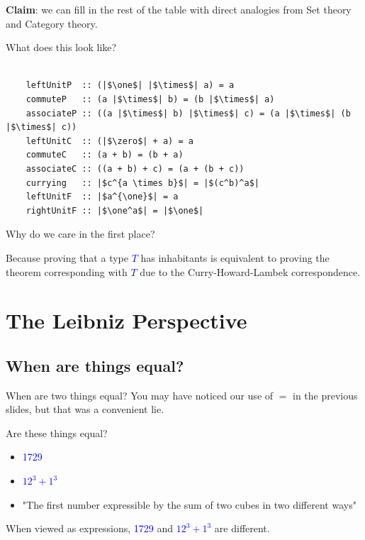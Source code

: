 \documentclass[tikz]{beamer}
\newcommand{\zero}{\bm{\mathbb{0}}}
\newcommand{\one}{\bm{\mathbb{1}}}
\newcommand{\blue}[1]{\textcolor{blue}{#1}}
\newcommand{\mblue}[1]{\textcolor{blue}{$#1$}}
\theoremstyle{definition}
\begin{document}
\frame
{ 
	\textbf{Claim}: we can fill in the rest of the table with direct analogies from Set theory and Category theory. 
}


\begin{frame}[fragile]
	What does this look like?
	
	\begin{center}
	\begin{verbatim}
	
	leftUnitP  :: (|$\one$| |$\times$| a) = a
	commuteP   :: (a |$\times$| b) = (b |$\times$| a)
	associateP :: ((a |$\times$| b) |$\times$| c) = (a |$\times$| (b |$\times$| c))
	leftUnitC  :: (|$\zero$| + a) = a
	commuteC   :: (a + b) = (b + a)
	associateC :: ((a + b) + c) = (a + (b + c))
	currying   :: |$c^{a \times b}$| = |$(c^b)^a$|
	leftUnitF  :: |$a^{\one}$| = a
	rightUnitF :: |$\one^a$| = |$\one$|
	\end{verbatim}
	
	\end{center}
\end{frame}

\frame
{ 
	Why do we care in the first place? 
}

\frame
{ 
	Because proving that a type \mblue{T} has inhabitants is equivalent to proving the theorem corresponding with \mblue{T} due to the Curry-Howard-Lambek correspondence.
}



\section{The Leibniz Perspective}

\subsection{When are things equal?}
\frame
{
	When are two things equal? You may have noticed our use of $=$ in the previous slides, but that was a convenient lie.
}

\frame
{
	Are these things equal? 
	
	\begin{itemize}
		\item \blue{1729}
		\item \mblue{12^3 + 1^3}
		\item "The first number expressible by the sum of two cubes in two different ways"
	\end{itemize}
}

\frame
{
	When viewed as expressions, \blue{1729} and \mblue{12^3 + 1^3} are different.
}
\end{document}
